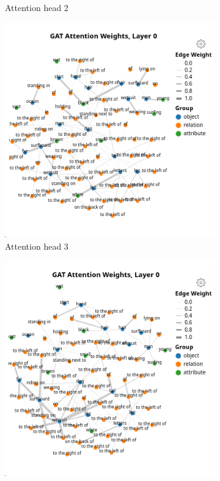 \begin{figure}[htbp]
\begin{subfigure}[r]{0.49\textwidth}
        \caption{Attention head 2}
    \end{subfigure}
    \begin{subfigure}[l]{0.49\textwidth}
        \includegraphics[width=\textwidth]{figures/positive_logical/positive_logical_gat_l0_h2.png}
        \caption{Attention head 3}
    \end{subfigure}
    \begin{subfigure}[r]{0.49\textwidth}
        \includegraphics[width=\textwidth]{figures/positive_logical/positive_logical_gat_l0_h3.png}

\end{subfigure}
\end{figure}
